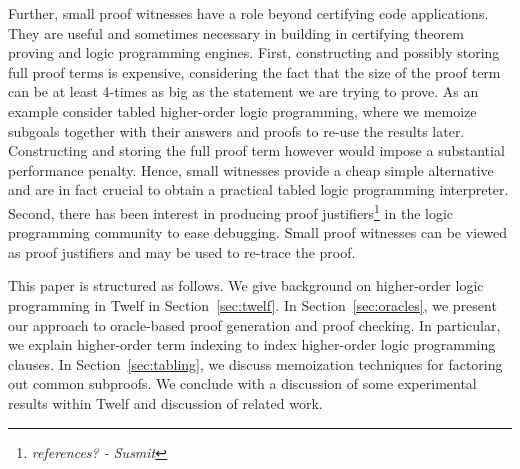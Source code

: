 \documentclass{acmconf}
\newcommand{\ednote}[1]{\footnote{\it #1}}
\begin{document}


Further, small proof witnesses have a role beyond certifying code
applications. They are useful and sometimes necessary in building in
certifying theorem proving and logic programming engines. First,
constructing and possibly storing full proof terms is expensive,
considering the fact that the size of the proof term can be at least
4-times as big as the statement we are trying to prove. As an example
consider tabled higher-order logic programming, where we memoize
subgoals together with their answers and proofs to re-use the results
later. Constructing and storing the full proof term however would
impose a substantial performance penalty. Hence, small witnesses
provide a cheap simple alternative and are in fact crucial to obtain a
practical tabled logic programming interpreter. Second, there has been
interest in producing proof justifiers\ednote{references? - Susmit} in
the logic programming community to ease debugging. Small proof
witnesses can be viewed as proof justifiers and may be used to
re-trace the proof.

This paper is structured as follows. We give background on
higher-order logic programming in Twelf in Section~\ref{sec:twelf}. In
Section~\ref{sec:oracles}, we present our approach to oracle-based
proof generation and proof checking. In particular, we explain
higher-order term indexing to index higher-order logic programming
clauses. In Section~\ref{sec:tabling}, we discuss memoization
techniques for factoring out common subproofs. We conclude with a
discussion of some experimental results within Twelf and discussion of
related work.
\end{document}
